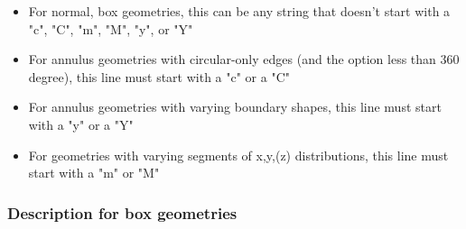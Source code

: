 \begin{description}
    \begin{itemize}

      \item For normal, box geometries, this can be any string that doesn't
        start with a "c", "C", "m", "M", "y", or "Y"

      \item For annulus geometries with circular-only edges (and the option
        less than 360 degree), this line must start with a "c" or a "C"

      \item For annulus geometries with varying boundary shapes, this line must
        start with a "y" or a "Y"

      \item For geometries with varying segments of x,y,(z) distributions, this
        line must start with a "m" or "M"

    \end{itemize}

\end{description}

\subsubsection{Description for box geometries}

